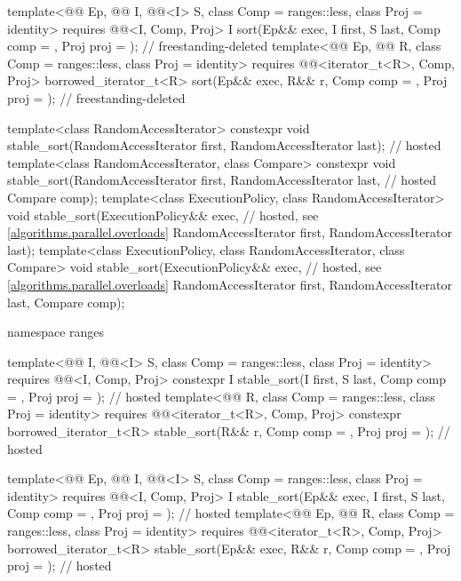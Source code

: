 \begin{codeblock}
{{    template<@@ Ep, @@ I, @@<I> S,
             class Comp = ranges::less, class Proj = identity>
      requires @@<I, Comp, Proj>
      I sort(Ep&& exec, I first, S last, Comp comp = {}, Proj proj = {});   // freestanding-deleted
    template<@@ Ep, @@ R, class Comp = ranges::less,
             class Proj = identity>
      requires @@<iterator_t<R>, Comp, Proj>
      borrowed_iterator_t<R>
        sort(Ep&& exec, R&& r, Comp comp = {}, Proj proj = {});             // freestanding-deleted
  }

  template<class RandomAccessIterator>
    constexpr void stable_sort(RandomAccessIterator first, RandomAccessIterator last);  // hosted
  template<class RandomAccessIterator, class Compare>
    constexpr void stable_sort(RandomAccessIterator first, RandomAccessIterator last,   // hosted
                               Compare comp);
  template<class ExecutionPolicy, class RandomAccessIterator>
    void stable_sort(ExecutionPolicy&& exec,                    // hosted, see \ref{algorithms.parallel.overloads}
                     RandomAccessIterator first, RandomAccessIterator last);
  template<class ExecutionPolicy, class RandomAccessIterator, class Compare>
    void stable_sort(ExecutionPolicy&& exec,                    // hosted, see \ref{algorithms.parallel.overloads}
                     RandomAccessIterator first, RandomAccessIterator last,
                     Compare comp);

  namespace ranges {
    template<@@ I, @@<I> S, class Comp = ranges::less,
             class Proj = identity>
      requires @@<I, Comp, Proj>
      constexpr I stable_sort(I first, S last, Comp comp = {}, Proj proj = {});         // hosted
    template<@@ R, class Comp = ranges::less, class Proj = identity>
      requires @@<iterator_t<R>, Comp, Proj>
      constexpr borrowed_iterator_t<R>
        stable_sort(R&& r, Comp comp = {}, Proj proj = {});                             // hosted

    template<@@ Ep, @@ I, @@<I> S,
             class Comp = ranges::less, class Proj = identity>
      requires @@<I, Comp, Proj>
      I stable_sort(Ep&& exec, I first, S last, Comp comp = {},
                    Proj proj = {});                                        // hosted
    template<@@ Ep, @@ R, class Comp = ranges::less,
             class Proj = identity>
      requires @@<iterator_t<R>, Comp, Proj>
      borrowed_iterator_t<R>
        stable_sort(Ep&& exec, R&& r, Comp comp = {}, Proj proj = {});      // hosted
  }

}
\end{codeblock}
